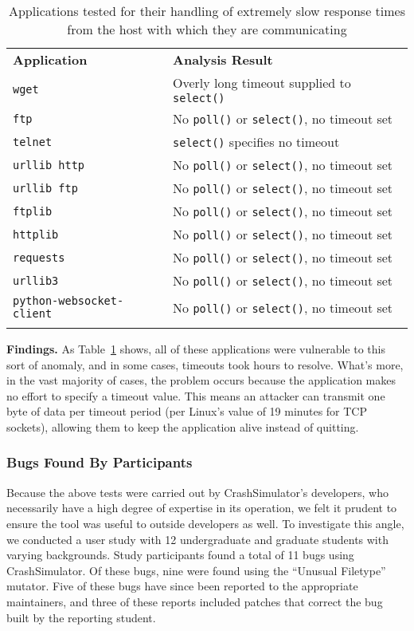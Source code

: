 \begin{table}[t]
  \scriptsize{}
  \begin{tabular}{l | l}
    \toprule{}
    {\bf Application}              & {\bf Analysis Result}\\
    {\tt wget}                     & Overly long timeout supplied to {\tt select()} \\
    {\tt ftp}                      & No {\tt poll()} or {\tt select()}, no timeout set \\
    {\tt telnet}                   & {\tt select()} specifies no timeout \\
    {\tt urllib http}              & No {\tt poll()} or {\tt select()}, no timeout set \\
    {\tt urllib ftp}               & No {\tt poll()} or {\tt select()}, no timeout set \\
    {\tt ftplib}                   & No {\tt poll()} or {\tt select()}, no timeout set \\
    {\tt httplib}                  & No {\tt poll()} or {\tt select()}, no timeout set \\
    {\tt requests}                 & No {\tt poll()} or {\tt select()}, no timeout set \\
    {\tt urllib3}                  & No {\tt poll()} or {\tt select()}, no timeout set \\
    {\tt python-websocket-client}  & No {\tt poll()} or {\tt select()}, no timeout set \\
    \bottomrule{}
  \end{tabular}
  \caption{Applications tested for their handling of extremely slow response
    times from the host with which they are communicating }
  \label{table:slowloris}
\end{table}


{\bf Findings.}
As Table~\ref{table:slowloris} shows, all of these
applications were vulnerable to this sort of anomaly,
and in some cases,
timeouts took hours to resolve.
What's more, in the vast majority of
cases, the problem occurs because the application makes no effort to
specify a timeout value.  This means an attacker can transmit one byte of
data per timeout period (per Linux's value of 19 minutes for TCP sockets),
allowing them to keep the application alive instead of quitting.

\subsubsection{Bugs Found By Participants}
Because the above tests were carried out by CrashSimulator's developers,
who necessarily have a high degree of expertise in its operation,
we felt it prudent to ensure the tool was useful
to outside developers as well.
To investigate this angle,
we conducted a user study
with 12 undergraduate and graduate students with varying backgrounds.
Study participants found a total of 11 bugs using CrashSimulator.
Of these bugs, nine were found using the ``Unusual Filetype'' mutator.
Five of these bugs have since been reported to the appropriate maintainers,
and three of these reports included patches
that correct the bug
built by the reporting student.

